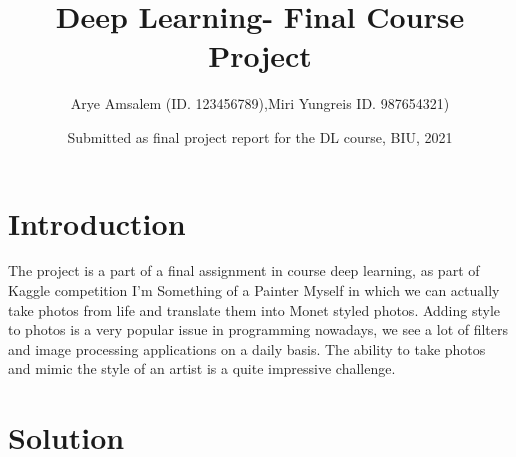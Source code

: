 \documentclass{article}
\title{Deep Learning- Final Course Project}
\author{Arye Amsalem (ID. 123456789),Miri Yungreis ID. 987654321)}
\date{Submitted as final project report for the DL course, BIU, 2021}
\begin{document}
\maketitle

\section{Introduction}
    The project is a part of a final assignment in course deep learning, as part of Kaggle competition I’m Something of a Painter Myself in which we can actually take photos from life and translate them into Monet styled photos. Adding style to photos is a very popular issue in programming nowadays, we see a lot of filters and image processing applications on a daily basis. The ability to take photos and mimic the style of an artist is a quite impressive challenge.
    \section{Solution}
\end{document}
